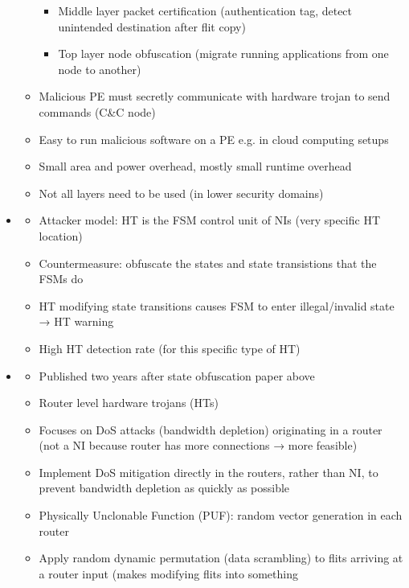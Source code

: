 \begin{itemize}
\begin{itemize}
\begin{itemize}
                    \item Middle layer packet certification (authentication tag, detect unintended destination after flit copy)
                    \item Top layer node obfuscation (migrate running applications from one node to another)
                \end{itemize}
            \item Malicious PE must secretly communicate with hardware trojan to send commands (C\&C node)
            \item Easy to run malicious software on a PE e.g. in cloud computing setups
            \item Small area and power overhead, mostly small runtime overhead
            \item Not all layers need to be used (in lower security domains)
        \end{itemize}
    \item \textbf{}
        \begin{itemize}
            \item Attacker model: HT is the FSM control unit of NIs (very specific HT location)
            \item Countermeasure: obfuscate the states and state transistions that the FSMs do
            \item HT modifying state transitions causes FSM to enter illegal/invalid state → HT warning
            \item High HT detection rate (for this specific type of HT)
        \end{itemize}
    \item \textbf{} \checkmark
        \begin{itemize}
            \item Published two years after state obfuscation paper above
            \item Router level hardware trojans (HTs)
            \item Focuses on DoS attacks (bandwidth depletion) originating in a router (not a NI because router has more connections → more
                feasible)
            \item Implement DoS mitigation directly in the routers, rather than NI, to prevent bandwidth depletion as quickly as possible
            \item Physically Unclonable Function (PUF): random vector generation in each router
            \item Apply random dynamic permutation (data scrambling) to flits arriving at a router input (makes modifying flits into something

\end{itemize}
\end{itemize}
